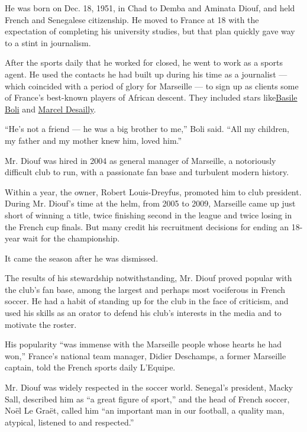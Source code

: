 He was born on Dec. 18, 1951, in Chad to Demba and Aminata Diouf, and
held French and Senegalese citizenship. He moved to France at 18 with
the expectation of completing his university studies, but that plan
quickly gave way to a stint in journalism.

After the sports daily that he worked for closed, he went to work as a
sports agent. He used the contacts he had built up during his time as a
journalist --- which coincided with a period of glory for Marseille ---
to sign up as clients some of France's best-known players of African
descent. They included stars
like\href{https://sport24.lefigaro.fr/football/ligue-1/fil-info/basile-boli-salue-la-memoire-de-son-ange-gardien-998313}{Basile
Boli} and
\href{https://www.theguardian.com/profile/marceldesailly}{Marcel
Desailly}.

``He's not a friend --- he was a big brother to me,'' Boli said. ``All
my children, my father and my mother knew him, loved him.''

Mr. Diouf was hired in 2004 as general manager of Marseille, a
notoriously difficult club to run, with a passionate fan base and
turbulent modern history.

Within a year, the owner, Robert Louis-Dreyfus, promoted him to club
president. During Mr. Diouf's time at the helm, from 2005 to 2009,
Marseille came up just short of winning a title, twice finishing second
in the league and twice losing in the French cup finals. But many credit
his recruitment decisions for ending an 18-year wait for the
championship.

It came the season after he was dismissed.

The results of his stewardship notwithstanding, Mr. Diouf proved popular
with the club's fan base, among the largest and perhaps most vociferous
in French soccer. He had a habit of standing up for the club in the face
of criticism, and used his skills as an orator to defend his club's
interests in the media and to motivate the roster.

His popularity ``was immense with the Marseille people whose hearts he
had won,'' France's national team manager, Didier Deschamps, a former
Marseille captain, told the French sports daily L'Equipe.

Mr. Diouf was widely respected in the soccer world. Senegal's president,
Macky Sall, described him as ``a great figure of sport,'' and the head
of French soccer, Noël Le Graët, called him ``an important man in our
football, a quality man, atypical, listened to and respected.''

